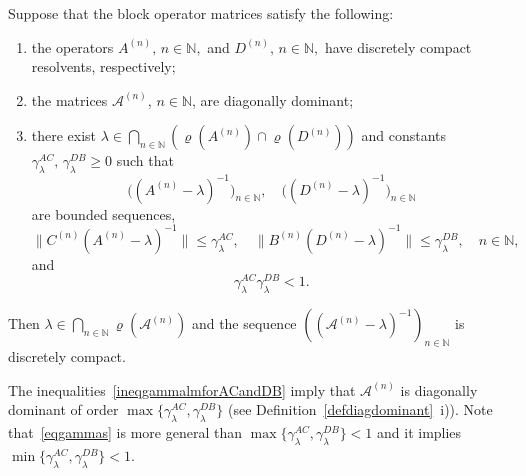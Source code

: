 \documentclass[a4paper,reqno]{amsart}
\begin{document}
\begin{theorem}
Suppose that the block operator matrices satisfy the following:
\begin{enumerate}[label=\rm{\roman{*})}]
\item the operators $A^{(n)}, \,n\in{\mathbb{N}},$  and  $D^{(n)}, \,n\in{\mathbb{N}},$ have discretely compact resolvents, respectively;
\item the matrices ${\mathcal A}^{(n)}$, $n\in{\mathbb{N}}$, are diagonally dominant; 
\item 
there exist $\lambda\in\underset{n\in{\mathbb{N}}}{\bigcap}\left(\varrho(A^{(n)})\cap\varrho(D^{(n)})\right)$ and constants $\gamma_\lambda^{AC}, \,\gamma_\lambda^{DB}\geq 0$ such that
$$\big((A^{(n)}-\lambda)^{-1}\big)_{n\in{\mathbb{N}}}, \quad \big((D^{(n)}-\lambda)^{-1}\big)_{n\in{\mathbb{N}}}$$ are bounded sequences,
\begin{equation} \big\|C^{(n)}(A^{(n)}-\lambda)^{-1}\big\|\leq\gamma_\lambda^{AC},\quad \big\|B^{(n)}(D^{(n)}-\lambda)^{-1}\big\|\leq\gamma_\lambda^{DB}, \quad n\in{\mathbb{N}},\label{ineqgammalmforACandDB}\end{equation}
and \begin{equation} \gamma_\lambda^{AC} \gamma_\lambda^{DB}<1.\label{eqgammas}\end{equation}
\end{enumerate}
Then 
$\lambda\in\underset{n\in{\mathbb{N}}}{\bigcap}\varrho({\mathcal A}^{(n)})$ and the sequence
 $\left(({\mathcal A}^{(n)}-\lambda)^{-1}\right)_{n\in{\mathbb{N}}}$ is discretely compact.
\label{propmatrixwithdiscrcompres}
\end{theorem}

\begin{rem}\label{remgammaorder}
 The inequalities~\eqref{ineqgammalmforACandDB} imply that ${\mathcal A}^{(n)}$ is diagonally dominant of order $\max\{\gamma_\lambda^{AC},\gamma_\lambda^{DB}\}$ (see Definition~\ref{defdiagdominant}~i)).
Note that~\eqref{eqgammas} is more general than $\max\{\gamma_\lambda^{AC},\gamma_\lambda^{DB}\}<1$
and it implies $\min\{\gamma_\lambda^{AC},\gamma_\lambda^{DB}\}<1$.
\end{rem}
\end{document}
